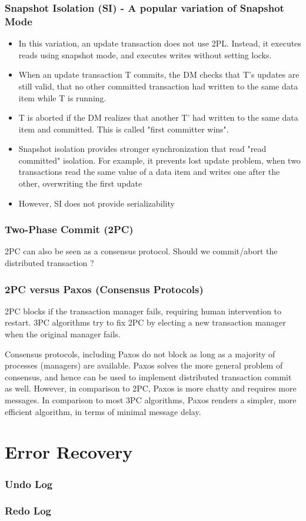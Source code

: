 \documentclass[12]{beamer}
\begin{document}
\begin{frame}
\frametitle{Snapshot Isolation (SI) - A popular variation of Snapshot Mode}
\begin{itemize}
\item In this variation, an update transaction does not use 2PL. Instead, it executes reads using snapshot mode, and executes writes without setting locks.
\item When an update transaction T commits, the DM checks that T's updates are still valid, that no other committed transaction had written to the same data item while T is running.
\item T is aborted if the DM realizes that another T' had written to the same data item and committed. This is called "first committer wins".
\item Snapshot isolation provides stronger synchronization that read "read committed" isolation. For example, it prevents lost update problem, when two transactions read the same value of a data item and writes one after the other, overwriting the first update
\item However, SI does not provide serializability
\end{itemize}
\end{frame}

\begin{frame}
\frametitle{Two-Phase Commit (2PC)}
2PC can also be seen as a consensus protocol. Should we commit/abort the distributed transaction ?
\end{frame}

\begin{frame}
\frametitle{2PC versus Paxos (Consensus Protocols)}
2PC blocks if the transaction manager fails, requiring human intervention to restart. 3PC algorithms try to fix 2PC by electing a new transaction manager when the original manager fails.
\vspace{10pt}

Consensus protocols, including Paxos do not block as long as a majority of processes (managers) are available. Paxos solves the more general problem of consensus, and hence can be used to implement distributed transaction commit as well. However, in comparison to 2PC, Paxos is more chatty and requires more messages. In comparison to most 3PC algorithms, Paxos renders a simpler, more efficient algorithm, in terms of minimal message delay.
\end{frame}

\section{Error Recovery}

\begin{frame}
  \frametitle{Undo Log}
\end{frame}

\begin{frame}
  \frametitle{Redo Log}
\end{frame}
\end{document}
